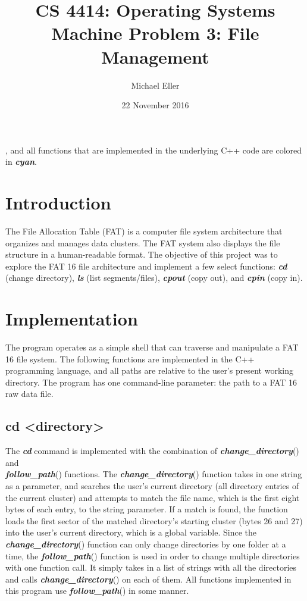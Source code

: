 \documentclass[12pt,letter,titlepage]{article}
\title{\blue CS 4414: Operating Systems\\
\blueb Machine Problem 3: File Management}
\author{Michael Eller}
\date{22 November 2016}
\begin{document}
\maketitle

, and all functions that are implemented in the underlying C++ code are colored in {\color{cyan}\textbf{\textit{cyan}}}.
\section*{Introduction}
The File Allocation Table (FAT) is a computer file system architecture that organizes and manages data clusters. The FAT system also displays the file structure in a human-readable format. The objective of this project was to explore the FAT 16 file architecture and implement a few select functions: {\color{orange}\textbf{\textit{cd}}} (change directory), {\color{orange}\textbf{\textit{ls}}} (list segments/files), {\color{orange}\textbf{\textit{cpout}}} (copy out), and {\color{orange}\textbf{\textit{cpin}}} (copy in).

\section*{Implementation}
The program operates as a simple shell that can traverse and manipulate a FAT 16 file system. The following functions are implemented in the C++ programming language, and all paths are relative to the user's present working directory. The program has one command-line parameter: the path to a FAT 16 raw data file.

\subsection*{cd <directory>}{
The {\color{orange}\textbf{\textit{cd}}} command is implemented with the combination of {\color{cyan}\textbf{\textit{change\_directory}}}() and \\{\color{cyan}\textbf{\textit{follow\_path}}}() functions. The {\color{cyan}\textbf{\textit{change\_directory}}}() function takes in one string as a parameter, and searches the user's current directory (all directory entries of the current cluster) and attempts to match the file name, which is the first eight bytes of each entry, to the string parameter. If a match is found, the function loads the first sector of the matched directory's starting cluster (bytes 26 and 27) into the user's current directory, which is a global variable. Since the {\color{cyan}\textbf{\textit{change\_directory}}}() function can only change directories by one folder at a time, the {\color{cyan}\textbf{\textit{follow\_path}}}() function is used in order to change multiple directories with one function call. It simply takes in a list of strings with all the directories and calls {\color{cyan}\textbf{\textit{change\_directory}}}() on each of them. All functions implemented in this program use {\color{cyan}\textbf{\textit{follow\_path}}}() in some manner.
}
\end{document}
